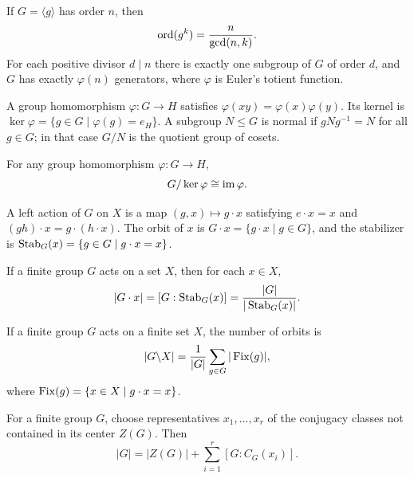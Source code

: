 \begin{theorem}
If $G=\langle g\rangle$ has order $n$, then
\[
 \operatorname{ord}(g^k)=\frac{n}{\gcd(n, k)}.
\]
For each positive divisor $d\mid n$ there is exactly one subgroup of $G$ of order $d$, and $G$ has exactly $\varphi(n)$ generators, where $\varphi$ is Euler's totient function.
\end{theorem}

\begin{definition}
A group homomorphism $\varphi\colon G\to H$ satisfies $\varphi(xy)=\varphi(x)\varphi(y)$. Its kernel is $\ker\varphi=\{g\in G\mid\varphi(g)=e_H\}$. A subgroup $N\le G$ is normal if $gNg^{-1}=N$ for all $g\in G$; in that case $G/N$ is the quotient group of cosets.
\end{definition}

\begin{theorem}
For any group homomorphism $\varphi\colon G\to H$,
\[
 G/\ker\varphi\cong\operatorname{im}\varphi.
\]
\end{theorem}

\begin{definition}
A left action of $G$ on $X$ is a map $(g, x)\mapsto g\cdot x$ satisfying $e\cdot x=x$ and $(gh)\cdot x=g\cdot(h\cdot x)$. The orbit of $x$ is $G\cdot x=\{g\cdot x\mid g\in G\}$, and the stabilizer is $\operatorname{Stab}_G(x)=\{g\in G\mid g\cdot x=x\}$.
\end{definition}

\begin{theorem}
If a finite group $G$ acts on a set $X$, then for each $x\in X$,
\[
 |G\cdot x|=[G:\operatorname{Stab}_G(x)]
 =\frac{|G|}{|\operatorname{Stab}_G(x)|}.
\]
\end{theorem}

\begin{theorem}
If a finite group $G$ acts on a finite set $X$, the number of orbits is
\[
 |G\backslash X|=\frac1{|G|}\sum_{g\in G}|\operatorname{Fix}(g)|,
\]
where $\operatorname{Fix}(g)=\{x\in X\mid g\cdot x=x\}$.
\end{theorem}

\begin{theorem}
For a finite group $G$, choose representatives $x_1, \dots, x_r$ of the conjugacy classes not contained in its center $Z(G)$. Then
\[
 |G|=|Z(G)|+\sum_{i=1}^r[G:C_G(x_i)].
\]
\end{theorem}

